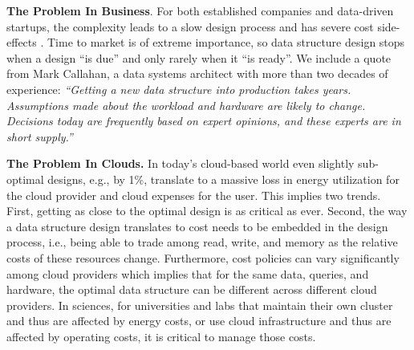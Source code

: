 \documentclass[11pt]{article}
\begin{document}
\textbf{The Problem In Business}. For both established companies and data-driven startups, the complexity leads to a slow design process and has severe cost side-effects \cite{Bernstein1987a,Cheung2015}. Time to market is of extreme importance, so data structure design stops when a design ``is due'' and only rarely when it ``is ready''. We include a quote from Mark Callahan, a data systems architect with more than two decades of experience: \textit{``Getting a new data structure into production takes years. Assumptions made about the workload and hardware are likely to change. Decisions today are frequently based on expert opinions, and these experts are in short supply.''}

\textbf{The Problem In Clouds.} In today's cloud-based world even slightly sub-optimal designs, e.g., by 1\%, translate to a massive loss in energy utilization \cite{Kossman2018} for the cloud provider and cloud expenses for the user. This implies two trends. First, getting as close to the optimal design is as critical as ever. Second, the way a data structure design translates to cost needs to be embedded in the design process, i.e., being able to trade among read, write, and memory as the relative costs of these resources change. Furthermore, cost policies can vary significantly among cloud providers which implies that for the same data, queries, and hardware, the optimal data structure can be different across different cloud providers. In sciences, for universities and labs that maintain their own cluster and thus are affected by energy costs, or use cloud infrastructure and thus are affected by operating costs, it is critical to manage those costs.
\end{document}
